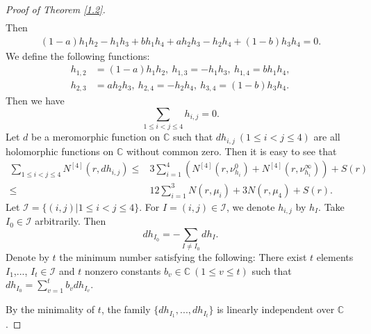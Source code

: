 \documentclass[10pt,a4paper]{amsart}
\newcommand{\C}{{\mathbb{C}}}
\begin{document}
\begin{proof}[Proof of Theorem \ref{1.2}]
\begin{align*}
\end{align*}
Then
\begin{align*}
(1-a)h_1h_2-h_1h_3+bh_1h_4+a h_2h_3-h_2h_4+(1-b) h_3h_4=0.
\end{align*}
We define the following functions:
\begin{align*}
h_{1,2}&=(1-a)h_1h_2,\ h_{1,3}=-h_1h_3,\ h_{1,4}=b h_1h_4,\\
h_{2,3}&=a h_2h_3,\ h_{2,4}=-h_2h_4,\ h_{3,4}=(1-b) h_3h_4.
\end{align*}
Then we have 
$$ \sum_{1\le i<j\le 4}h_{i,j}=0. $$
Let $d$ be a meromorphic function on $\C$ such that $dh_{i,j}\ (1\le i<j\le 4)$ are all holomorphic functions on $\C$ without common zero. Then it is easy to see that
\begin{align*}
 \sum_{1\le i<j\le 4}N^{[4]}(r,dh_{i,j})\le& 3\sum_{i=1}^4(N^{[4]}(r,\nu^0_{h_i})+N^{[4]}(r,\nu^\infty_{h_i}))+S(r)\\ 
\le& 12\sum_{i=1}^3N(r,\mu_i)+3N(r,\mu_4)+S(r).
\end{align*}
Let $\mathcal I=\{(i,j)|1\le i<j\le 4\}$. For $I=(i,j)\in\mathcal I$, we denote $h_{i,j}$ by $h_{I}$.
Take $I_0\in\mathcal I$ arbitrarily. Then 
$$dh_{I_0}=-\sum_{I\ne I_0}dh_I.$$
Denote by $t$ the minimum number satisfying the following: There exist $t$ elements $I_1$,..., $I_t \in\mathcal I$ and $t$ nonzero constants $b_v\in\C\ (1\le v\le t)$ such that $dh_{I_0}=\sum_{v=1}^tb_vdh_{I_v}.$

By the minimality of $t$, the family $\{dh_{I_1},...,dh_{I_t}\}$ is linearly independent over $\C$.


\end{proof}
\end{document}
